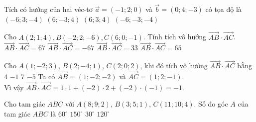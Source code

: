 \begin{ex}
	Tích có hướng của hai véc-tơ $\vec{a}=(-1;2;0)$ và $\vec{b}=(0;4;-3)$ có tọa độ là
	\choice
	{$(-6;3;-4)$}
	{$(6;-3;4)$}
	{$(6;3;4)$}
	{\True $(-6;-3;-4)$}
\end{ex} 

\begin{ex}
	Cho $ A(2;1;4), B(-2;2;-6), C(6;0;-1) $. Tính tích vô hướng $ \vec{AB}\cdot \vec{AC} $.
	\choice
	{$\vec{AB}\cdot \vec{AC}=67$}
	{$\vec{AB}\cdot \vec{AC}=-67$}
	{\True$\vec{AB}\cdot \vec{AC}=33$}
	{$\vec{AB}\cdot \vec{AC}=65$}
\end{ex} 

\begin{ex}
	Cho $ A(1;-2; 3)$, $ B(2;-4; 1)$, $ C(2; 0; 2)$, khi đó tích vô hướng $\vec{AB}\cdot\vec{AC}$ bằng
	\choice
	{$4$}
	{\True $-1$}
	{$7$}
	{$-5$}
	\loigiai
	{
		Ta có $\vec{AB}=(1;-2;-2)$ và $\vec{AC}=(1; 2;-1)$.\\
		Vì vậy $\vec{AB}\cdot\vec{AC}=1\cdot 1+(-2)\cdot 2+(-2)\cdot (-1)=-1 $.
	}
\end{ex} 

\begin{ex}%
	Cho tam giác $ABC$ với $A(8; 9; 2)$, $B(3; 5; 1)$, $C(11; 10; 4)$. Số đo góc $A$ của tam giác $ABC$ là
	\choice
	{$60^\circ$}
	{\True $150^\circ$}
	{$30^\circ$}
	{$120^\circ$}
\end{ex} 

